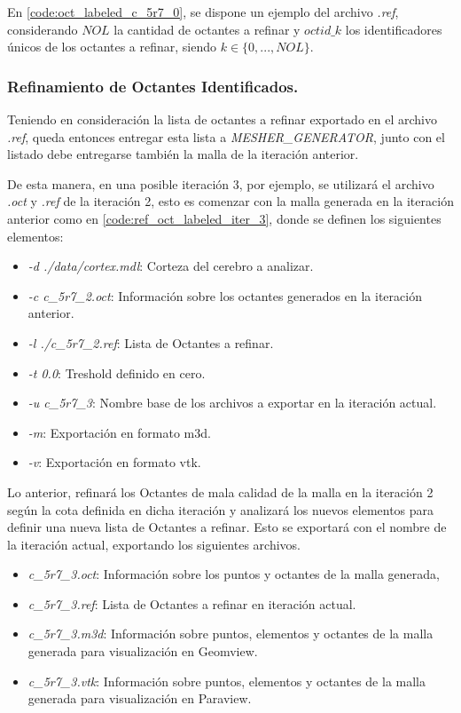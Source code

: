 En \autoref{code:oct_labeled_c_5r7_0}, se dispone un ejemplo del archivo \textit{.ref}, considerando $NOL$ la cantidad de octantes a refinar y $octid\_k$ los identificadores únicos de los octantes a refinar, siendo $k \in \{ 0, ..., NOL\}$.

\subsubsection{Refinamiento de Octantes Identificados.}

Teniendo en consideración la lista de octantes a refinar exportado en el archivo \textit{.ref}, queda entonces entregar esta lista a \textit{MESHER\_GENERATOR}, junto con el listado debe entregarse también la malla de la iteración anterior.

De esta manera, en una posible iteración 3, por ejemplo, se utilizará el archivo \textit{.oct} y \textit{.ref} de la iteración 2, esto es comenzar con la malla generada en la iteración anterior como en \autoref{code:ref_oct_labeled_iter_3}, donde se definen los siguientes elementos:

\begin{itemize}
    \item \textit{-d ./data/cortex.mdl}: Corteza del cerebro a analizar. 
    \item \textit{-c c\_5r7\_2.oct}: Información sobre los octantes generados en la iteración anterior.
    \item \textit{-l ./c\_5r7\_2.ref}: Lista de Octantes a refinar.
    \item \textit{-t 0.0}: Treshold definido en cero.
    \item \textit{-u c\_5r7\_3}: Nombre base de los archivos a exportar en la iteración actual.
    \item \textit{-m}: Exportación en formato m3d.
    \item \textit{-v}: Exportación en formato vtk.
\end{itemize}

Lo anterior, refinará los Octantes de mala calidad de la malla en la iteración 2 según la cota definida en dicha iteración y analizará los nuevos elementos para definir una nueva lista de Octantes a refinar.
Esto se exportará con el nombre de la iteración actual, exportando los siguientes archivos.

\begin{itemize}
    \item \textit{c\_5r7\_3.oct}: Información sobre los puntos y octantes de la malla generada,
    \item \textit{c\_5r7\_3.ref}: Lista de Octantes a refinar en iteración actual.
    \item \textit{c\_5r7\_3.m3d}: Información sobre puntos, elementos y octantes de la malla generada para visualización en Geomview.
    \item \textit{c\_5r7\_3.vtk}: Información sobre puntos, elementos y octantes de la malla generada para visualización en Paraview.
\end{itemize}


